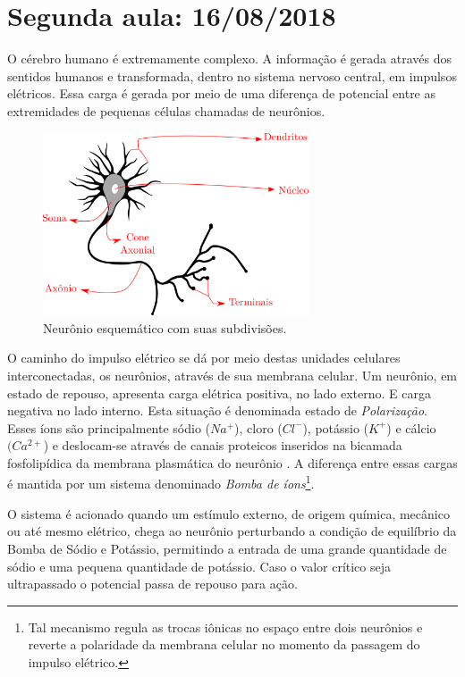 \section{Segunda aula: 16/08/2018}

O cérebro humano é extremamente complexo. A informação é gerada através dos sentidos humanos e transformada, dentro no sistema nervoso central, em impulsos elétricos. Essa carga é gerada por meio de uma diferença de potencial entre as extremidades de pequenas células chamadas de neurônios. 

\begin{figure}[H]
	\centering
	\includegraphics[width=0.7\textwidth]{Imagens/Fig3.png}
	\caption{Neurônio esquemático com suas subdivisões.}
\end{figure}

O caminho do impulso elétrico se dá por meio destas unidades celulares interconectadas, os neurônios, através de sua membrana celular. Um neurônio, em estado de repouso, apresenta carga elétrica positiva, no lado externo. E carga negativa no lado interno. Esta situação é denominada estado de \textit{Polarização}. Esses íons são principalmente sódio ($Na^{+}$), cloro ($Cl^{-}$), potássio ($K^{+}$) e cálcio $(Ca^{2+}$) e deslocam-se através de canais proteicos inseridos na bicamada fosfolipídica da membrana plasmática do neurônio \citep{impulso2016}. A diferença entre essas cargas é mantida por um sistema denominado \textit{Bomba de íons}\footnote{Tal mecanismo regula as trocas iônicas no espaço entre dois neurônios e reverte a polaridade da membrana celular no momento da passagem do impulso elétrico.}.

O sistema é acionado quando um estímulo externo, de origem química, mecânico ou até mesmo elétrico, chega ao neurônio perturbando a condição de equilíbrio da Bomba de Sódio e Potássio, permitindo a entrada de uma grande quantidade de sódio e uma pequena quantidade de potássio. Caso o valor crítico seja ultrapassado o potencial passa de repouso para ação. 


